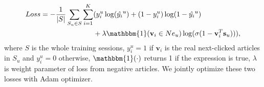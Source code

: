 \begin{equation}
    \begin{split}
        Loss = - \frac{1}{|S|}\sum_{S_u \in S}\sum_{i=1}^K &( y_i^u \log(\hat{y_i}^u) + (1-y_i^u)\log(1-\hat{y_i}^u) \\
        & +  \lambda \mathbbm{1}(\mathbf{v}_i \in Ne_u) \log(\sigma(1-\mathbf{v}_i^T\mathbf{s}_u))),
    \end{split}
\end{equation}
where $S$ is the whole training sessions, $y_i^u=1$ if $\mathbf{v}_i$ is the real next-clicked articles in $S_u$ and $y_i^u=0$ otherwise, $\mathbbm{1}(\cdot)$ returns 1 if the expression is true, $\lambda$ is weight parameter of loss from negative articles. We jointly optimize these two losses with Adam optimizer. 






